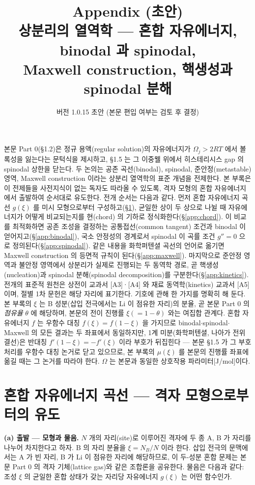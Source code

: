\documentclass[11pt,a4paper]{article}
\title{\textbf{\LARGE Appendix (초안)}\\[0.35em]\Large 상분리의 열역학 --- 혼합 자유에너지, binodal 과 spinodal,\\ Maxwell construction, 핵생성과 spinodal 분해}
\author{}
\date{\normalsize 버전 1.0.15 초안 \quad(본문 편입 여부는 검토 후 결정)}
\begin{document}
\maketitle

본문 Part 0(\S1.2)은 정규 용액(regular solution)의 자유에너지가 $\Omega_j>2RT$ 에서 볼록성을 잃는다는
문턱식을 제시하고, \S1.5 는 그 이중웰 위에서 히스테리시스 gap 의 spinodal 상한을 닫는다. 두 논의는
공존 곡선(binodal), spinodal, 준안정(metastable) 영역, Maxwell construction 이라는 상분리 열역학의
표준 개념을 전제한다. 본 부록은 이 전제들을 사전지식이 없는 독자도 따라올 수 있도록, 격자 모형의
혼합 자유에너지에서 출발하여 순서대로 유도한다. 전개 순서는 다음과 같다. 먼저 혼합 자유에너지
곡선 $g(\xi)$ 를 미시 모형으로부터 구성하고(\S\ref{app:mixfe}), 균일한 상이 두 상으로 나뉠 때
자유에너지가 어떻게 비교되는지를 현(chord) 의 기하로 정식화한다(\S\ref{app:chord}). 이 비교를
최적화하면 공존 조성을 결정하는 공통접선(common tangent) 조건과 binodal 이 얻어지고(\S\ref{app:binodal}),
국소 안정성의 경계로서 spinodal 이 곡률 조건 $g''=0$ 으로 정의된다(\S\ref{app:spinodal}).
같은 내용을 화학퍼텐셜 곡선의 언어로 옮기면 Maxwell construction 의 등면적 규칙이
된다(\S\ref{app:maxwell}). 마지막으로 준안정 영역과 불안정 영역에서 상분리가 실제로 진행되는 두
동역학 경로, 곧 핵생성(nucleation)과 spinodal 분해(spinodal decomposition)를
구분한다(\S\ref{app:kinetics}). 전개의 표준적 원천은 상전이 교과서 [A3]·[A4] 와 재료 동역학(kinetics) 교과서
[A5] 이며, 절별 1차 문헌은 해당 자리에 표기한다. 기호에 관해 한 가지를 명확히 해 둔다. 본 부록의 $\xi$ 는 B 성분(삽입
전극에서는 Li 이 점유한 자리)의 분율, 곧 본문 Part 0 의 \emph{점유율} $\theta$ 에 해당하며, 본문의 전이
진행률 $\xi(=1-\theta)$ 와는 여집합 관계다. 혼합 자유에너지 $f$ 는 우함수 대칭 $f(\xi)=f(1-\xi)$ 을
가지므로 binodal$\cdot$spinodal$\cdot$Maxwell 의 모든 결과는 두 좌표에서 동일하지만, 1계
미분(화학퍼텐셜, 나아가 전위 결선)은 반대칭 $f'(1-\xi)=-f'(\xi)$ 이라 부호가 뒤집힌다 --- 본문
\S1.5 가 그 부호 처리를 우함수 대칭 논거로 닫고 있으므로, 본 부록의 $\mu(\xi)$ 를 본문의 진행률 좌표에
옮길 때는 그 논거를 따라야 한다. $\Omega$ 는 본문과 동일한 상호작용 파라미터[J/mol]이다.

\section{혼합 자유에너지 곡선 --- 격자 모형으로부터의 유도}\label{app:mixfe}

\textbf{(a) 출발 --- 모형과 물음.} $N$ 개의 자리(site)로 이루어진 격자에 두 종 A, B 가 자리를 나누어
차지한다고 하자. B 의 자리 분율을 $\xi=N_B/N$ 이라 한다. 삽입 전극의 문맥에서는 A 가 빈 자리, B 가
Li 이 점유한 자리에 해당하므로, 이 두-성분 혼합 문제는 본문 Part 0 의 격자 기체(lattice gas)와 같은
조합론을 공유한다. 물음은 다음과 같다: 조성 $\xi$ 의 균일한 혼합 상태가 갖는 자리당 자유에너지
$g(\xi)$ 는 어떤 함수인가.
\end{document}
